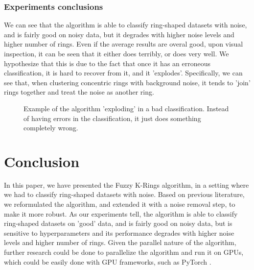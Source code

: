 \documentclass[conference]{IEEEtran}
\begin{document}
\subsubsection{Experiments conclusions}
We can see that the algorithm is able to classify ring-shaped datasets with noise, and is fairly good on noisy data, but it degrades with higher noise levels and higher number of rings.
Even if the average results are overal good, upon visual inspection, it can be seen that it either does terribly, or does very well. We hypothesize that this is due
to the fact that once it has an erroneous classification, it is hard to recover from it, and it 'explodes'.
Specifically, we can see that, when clustering concentric rings with background noise, it tends to 'join' rings together and treat the noise as another ring.

\begin{figure}
    \centering
    \resizebox{0.65\linewidth}{!}{}
    \label{fig:bad_class}
    \caption{Example of the algorithm 'exploding' in a bad classification. Instead of having errors in the classification, it just does something completely wrong.}
\end{figure}

\section{Conclusion}
In this paper, we have presented the Fuzzy K-Rings algorithm, in a setting where we had to classify ring-shaped datasets with noise. Based on previous literature,
we reformulated the algorithm, and extended it with a noise removal step, to make it more robust. As our experiments tell, the algorithm is able to classify ring-shaped datasets
on 'good' data, and is fairly good on noisy data, but is sensitive to hyperparameters and its performance degrades with higher noise levels and higher number of rings.
Given the parallel nature of the algorithm, further research could be done to parallelize the algorithm and run it on GPUs, which could be easily done with GPU frameworks,
such as PyTorch \cite{paszke2019pytorch}.




\end{document}
